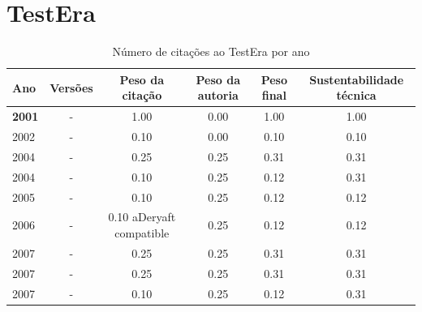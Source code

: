\section{TestEra}


\begin{table}[H]
\caption{Número de citações ao TestEra por ano}
\centering
\begin{tabular}{| l | c | c | c | c | c |}
  \hline
  Ano & Versões & Peso da citação & Peso da autoria & Peso final & Sustentabilidade técnica \\
  \hline
            {\bf 2001}
          &
          -
          &
          1.00
          &
          0.00
          &
          1.00
          &
            {\color{blue} 1.00}
          \\
\hline
            2002
          &
          -
          &
          0.10
          &
          0.00
          &
          0.10
          &
            {\color{red} 0.10}
          \\
\hline
            2004
          &
          -
          &
          0.25
          &
          0.25
          &
          0.31
          &
            {\color{red} 0.31}
          \\
            2004
          &
          -
          &
          0.10
          &
          0.25
          &
          0.12
          &
            {\color{red} 0.31}
          \\
\hline
            2005
          &
          -
          &
          0.10
          &
          0.25
          &
          0.12
          &
            {\color{red} 0.12}
          \\
\hline
            2006
          &
          -
          &
          0.10
            {\tiny aDeryaft compatible}
          &
          0.25
          &
          0.12
          &
            {\color{red} 0.12}
          \\
\hline
            2007
          &
          -
          &
          0.25
          &
          0.25
          &
          0.31
          &
            {\color{red} 0.31}
          \\
            2007
          &
          -
          &
          0.25
          &
          0.25
          &
          0.31
          &
            {\color{red} 0.31}
          \\
            2007
          &
          -
          &
          0.10
          &
          0.25
          &
          0.12
          &
            {\color{red} 0.31}
          \\

\end{tabular}
\end{table}

